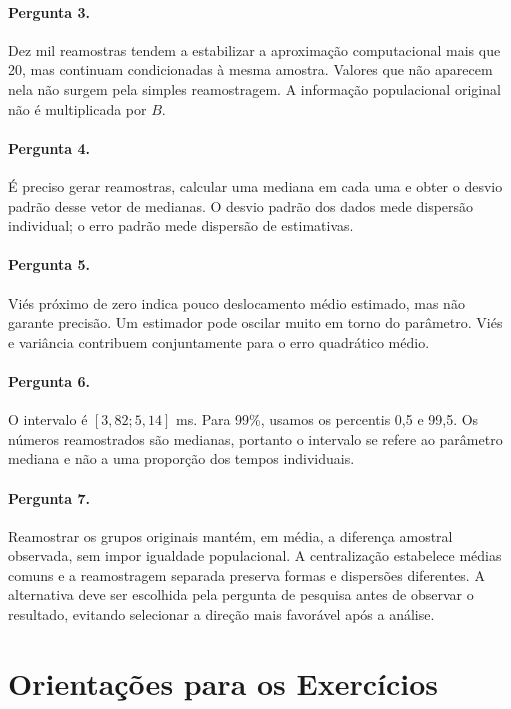 \documentclass[12pt,a4paper]{article}
\begin{document}
\paragraph{Pergunta 3.} Dez mil reamostras tendem a estabilizar a aproximação computacional mais que 20, mas continuam condicionadas à mesma amostra. Valores que não aparecem nela não surgem pela simples reamostragem. A informação populacional original não é multiplicada por $B$.

\paragraph{Pergunta 4.} É preciso gerar reamostras, calcular uma mediana em cada uma e obter o desvio padrão desse vetor de medianas. O desvio padrão dos dados mede dispersão individual; o erro padrão mede dispersão de estimativas.

\paragraph{Pergunta 5.} Viés próximo de zero indica pouco deslocamento médio estimado, mas não garante precisão. Um estimador pode oscilar muito em torno do parâmetro. Viés e variância contribuem conjuntamente para o erro quadrático médio.

\paragraph{Pergunta 6.} O intervalo é $[3{,}82;5{,}14]$ ms. Para 99\%, usamos os percentis 0,5 e 99,5. Os números reamostrados são medianas, portanto o intervalo se refere ao parâmetro mediana e não a uma proporção dos tempos individuais.

\paragraph{Pergunta 7.} Reamostrar os grupos originais mantém, em média, a diferença amostral observada, sem impor igualdade populacional. A centralização estabelece médias comuns e a reamostragem separada preserva formas e dispersões diferentes. A alternativa deve ser escolhida pela pergunta de pesquisa antes de observar o resultado, evitando selecionar a direção mais favorável após a análise.

\section{Orientações para os Exercícios}
\label{ap:exercicios}
\end{document}
